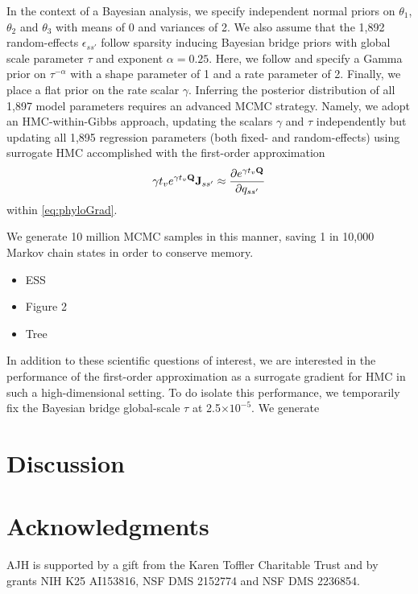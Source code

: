 \documentclass[12pt]{article} %
\begin{document}
In the context of a Bayesian analysis, we specify independent normal priors on $\theta_1$, $\theta_2$ and $\theta_3$ with means of 0 and variances of 2.  We also assume that the 1,892 random-effects $\epsilon_{ss'}$ follow sparsity inducing Bayesian bridge priors with global scale parameter $\tau$ and exponent $\alpha=0.25$.  Here, we follow \citet{nishimura2022shrinkage} and specify a Gamma prior on $\tau^{-\alpha}$ with a shape parameter of 1 and a rate parameter of 2. Finally, we place a flat prior on the rate scalar $\gamma$.  Inferring the posterior distribution of all 1,897 model parameters requires an advanced MCMC strategy. Namely, we adopt an HMC-within-Gibbs approach, updating the scalars $\gamma$ and $\tau$ independently but updating all 1,895 regression parameters (both fixed- and random-effects) using surrogate HMC accomplished with the first-order approximation
\begin{align*}
  \gamma t_v  e^{\gamma t_v \mathbf{Q}} \mathbf{J}_{ss'}    \approx \frac{\partial e^{\gamma t_v \mathbf{Q}}}{\partial q_{ss'}} 
\end{align*}
within \eqref{eq:phyloGrad}.

We generate 10 million MCMC samples in this manner, saving 1 in 10,000 Markov chain states in order to conserve memory.  
\begin{itemize}
	\item ESS
	\item Figure 2
	\item Tree
\end{itemize}

In addition to these scientific questions of interest, we are interested in the performance of the first-order approximation as a surrogate gradient for HMC in such a high-dimensional setting. To do isolate this performance, we temporarily fix the Bayesian bridge global-scale $\tau$ at 2.5$\times10^{-5}$.  We generate 


\section{Discussion}


\section*{Acknowledgments}

AJH is supported by a gift from the Karen Toffler Charitable Trust and by grants NIH K25 AI153816, NSF DMS 2152774 and NSF DMS 2236854.
\end{document}

